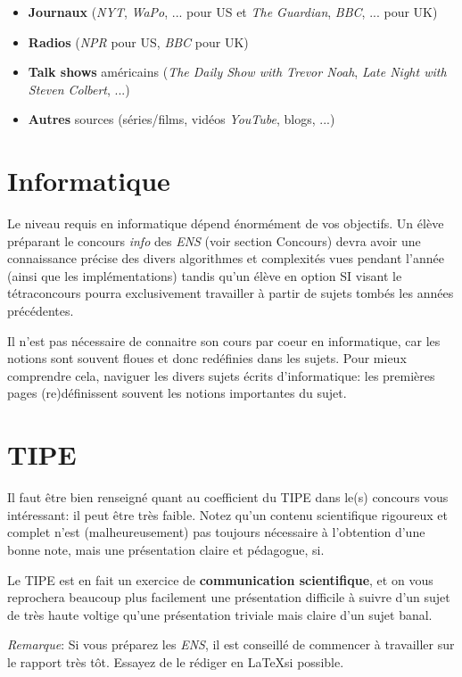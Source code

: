 \documentclass{article}
\begin{document}
\begin{itemize}
\item  \textbf{Journaux} (\textit{NYT}, \textit{WaPo}, ... pour US et \textit{The Guardian}, \textit{BBC}, ... pour UK)
\item  \textbf{Radios} (\textit{NPR} pour US, \textit{BBC} pour UK)
\item  \textbf{Talk shows} américains (\textit{The Daily Show with Trevor Noah}, \textit{Late Night with Steven Colbert}, ...)
\item  \textbf{Autres} sources (séries/films, vidéos \textit{YouTube}, blogs, ...)

\end{itemize}

\section{Informatique}
Le niveau requis en informatique dépend énormément de vos objectifs.
Un élève préparant le concours \textit{info} des \textit{ENS} (voir section Concours) devra avoir une connaissance précise des divers algorithmes et complexités vues pendant l'année (ainsi que les implémentations) tandis qu'un élève en option SI visant le tétraconcours pourra exclusivement travailler à partir de sujets tombés les années précédentes.

Il n'est pas nécessaire de connaitre son cours par coeur en informatique, car les notions sont souvent floues et donc redéfinies dans les sujets.
Pour mieux comprendre cela, naviguer les divers sujets écrits d'informatique: les premières pages (re)définissent souvent les notions importantes du sujet.

\section{TIPE}
Il faut être bien renseigné quant au coefficient du TIPE dans le(s) concours vous intéressant: il peut être très faible.
Notez qu'un contenu scientifique rigoureux et complet n'est (malheureusement) pas toujours nécessaire à l'obtention d'une bonne note, mais une présentation claire et pédagogue, si.

Le TIPE est en fait un exercice de \textbf{communication scientifique}, et on vous reprochera beaucoup plus facilement une présentation difficile à suivre d'un sujet de très haute voltige qu'une présentation triviale mais claire d'un sujet banal.

\textit{Remarque}: Si vous préparez les \textit{ENS}, il est conseillé de commencer à travailler sur le rapport très tôt.
Essayez de le rédiger en \LaTeX si possible.
\end{document}
